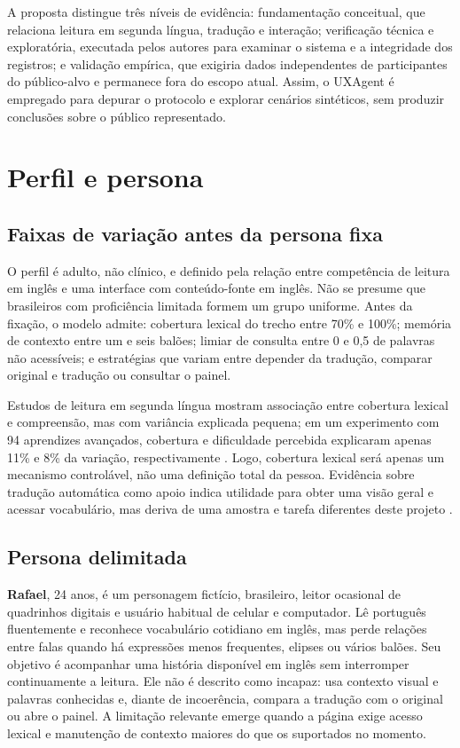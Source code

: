 \documentclass[conference]{IEEEtran}
\begin{document}
A proposta distingue três níveis de evidência: fundamentação conceitual, que relaciona leitura em segunda língua, tradução e interação; verificação técnica e exploratória, executada pelos autores para examinar o sistema e a integridade dos registros; e validação empírica, que exigiria dados independentes de participantes do público-alvo e permanece fora do escopo atual. Assim, o UXAgent é empregado para depurar o protocolo e explorar cenários sintéticos, sem produzir conclusões sobre o público representado.

\section{Perfil e persona}
\subsection{Faixas de variação antes da persona fixa}
O perfil é adulto, não clínico, e definido pela relação entre competência de leitura em inglês e uma interface com conteúdo-fonte em inglês. Não se presume que brasileiros com proficiência limitada formem um grupo uniforme. Antes da fixação, o modelo admite: cobertura lexical do trecho entre 70\% e 100\%; memória de contexto entre um e seis balões; limiar de consulta entre 0 e 0,5 de palavras não acessíveis; e estratégias que variam entre depender da tradução, comparar original e tradução ou consultar o painel.

Estudos de leitura em segunda língua mostram associação entre cobertura lexical e compreensão, mas com variância explicada pequena; em um experimento com 94 aprendizes avançados, cobertura e dificuldade percebida explicaram apenas 11\% e 8\% da variação, respectivamente \cite[pp.~1--2, 12--15]{webb2025}. Logo, cobertura lexical será apenas um mecanismo controlável, não uma definição total da pessoa. Evidência sobre tradução automática como apoio indica utilidade para obter uma visão geral e acessar vocabulário, mas deriva de uma amostra e tarefa diferentes deste projeto \cite[pp.~1--2, 12--15]{chung2023}.

\subsection{Persona delimitada}
\textbf{Rafael}, 24 anos, é um personagem fictício, brasileiro, leitor ocasional de quadrinhos digitais e usuário habitual de celular e computador. Lê português fluentemente e reconhece vocabulário cotidiano em inglês, mas perde relações entre falas quando há expressões menos frequentes, elipses ou vários balões. Seu objetivo é acompanhar uma história disponível em inglês sem interromper continuamente a leitura. Ele não é descrito como incapaz: usa contexto visual e palavras conhecidas e, diante de incoerência, compara a tradução com o original ou abre o painel. A limitação relevante emerge quando a página exige acesso lexical e manutenção de contexto maiores do que os suportados no momento.
\end{document}
